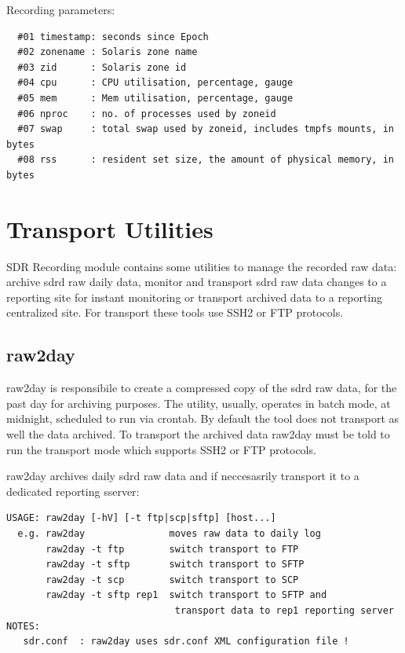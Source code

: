 \noindent
Recording parameters:

\begin{verbatim}
  #01 timestamp: seconds since Epoch
  #02 zonename : Solaris zone name
  #03 zid      : Solaris zone id
  #04 cpu      : CPU utilisation, percentage, gauge
  #05 mem      : Mem utilisation, percentage, gauge
  #06 nproc    : no. of processes used by zoneid
  #07 swap     : total swap used by zoneid, includes tmpfs mounts, in bytes
  #08 rss      : resident set size, the amount of physical memory, in bytes
\end{verbatim}


\section{Transport Utilities}
SDR Recording module contains some utilities to manage the recorded raw data: 
archive sdrd raw daily data, monitor and transport sdrd raw data changes 
to a reporting site for instant monitoring or transport archived data to a
reporting centralized site. For transport these tools use SSH2 or FTP protocols.

\subsection*{raw2day}
raw2day is responsibile to create a compressed copy of the sdrd raw data, 
for the past day for archiving purposes. The utility, usually, operates in 
batch mode, at midnight, scheduled to run via crontab. By default the tool 
does not transport as well the data archived. To transport the archived data 
raw2day must be told to run the transport mode which supports SSH2 or FTP protocols.

\noindent
\newline
raw2day archives daily sdrd raw data and if neccesasrily transport it
to a dedicated reporting sserver:
\begin{verbatim}
USAGE: raw2day [-hV] [-t ftp|scp|sftp] [host...]
  e.g. raw2day               moves raw data to daily log
       raw2day -t ftp        switch transport to FTP
       raw2day -t sftp       switch transport to SFTP
       raw2day -t scp        switch transport to SCP
       raw2day -t sftp rep1  switch transport to SFTP and 
                              transport data to rep1 reporting server
NOTES:
   sdr.conf  : raw2day uses sdr.conf XML configuration file !
\end{verbatim}


